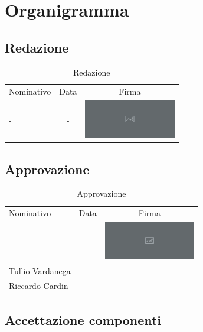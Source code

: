 \documentclass[../piano-di-progetto.tex]{subfiles}
\begin{document}
  \section{Organigramma}

  \subsection{Redazione}
  \centering
  \begin{table}[H]
    \begin{tabular}{lcc}
      Nominativo & Data & Firma \\
      - & - & \includegraphics[width=4cm]{img/ph.png}
    \end{tabular}
    \caption{Redazione}

  \end{table}

  \subsection{Approvazione}

  \begin{table}[H]
    \centering
    \begin{tabular}{lcc}
      Nominativo & Data & Firma \\
      - & - & \includegraphics[width=4cm]{img/ph.png} \\
      Tullio Vardanega & &    \\
      Riccardo Cardin & &
    \end{tabular}
    \caption{Approvazione}
  \end{table}

  \subsection{Accettazione componenti}
\end{document}
